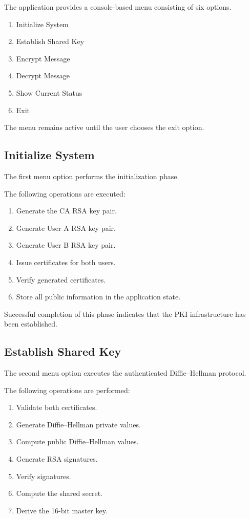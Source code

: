 \documentclass[12pt]{article}
\begin{document}
The application provides a console-based menu consisting of six options.

\begin{enumerate}
\item Initialize System
\item Establish Shared Key
\item Encrypt Message
\item Decrypt Message
\item Show Current Status
\item Exit
\end{enumerate}

The menu remains active until the user chooses the exit option.

\subsection{Initialize System}

The first menu option performs the initialization phase.

The following operations are executed:

\begin{enumerate}
\item Generate the CA RSA key pair.
\item Generate User A RSA key pair.
\item Generate User B RSA key pair.
\item Issue certificates for both users.
\item Verify generated certificates.
\item Store all public information in the application state.
\end{enumerate}

Successful completion of this phase indicates that the PKI infrastructure has been established.

\subsection{Establish Shared Key}

The second menu option executes the authenticated Diffie--Hellman protocol.

The following operations are performed:

\begin{enumerate}
\item Validate both certificates.
\item Generate Diffie--Hellman private values.
\item Compute public Diffie--Hellman values.
\item Generate RSA signatures.
\item Verify signatures.
\item Compute the shared secret.
\item Derive the 16-bit master key.
\end{enumerate}
\end{document}
